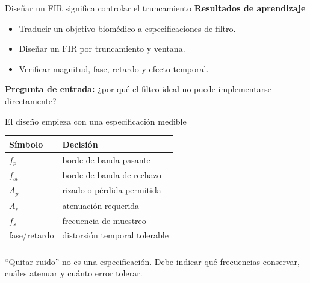 \documentclass[
  ignorenonframetext,
  aspectratio=169,
  spanish,
  professionalfonts]{beamer}
\newcounter{none} %
\providecommand{\tightlist}{%
  \setlength{\itemsep}{0pt}\setlength{\parskip}{0pt}}
\begin{document}
\begin{frame}{Diseñar un FIR significa controlar el truncamiento}
\protect{}\label{diseuxf1ar-un-fir-significa-controlar-el-truncamiento}
\textbf{Resultados de aprendizaje}

\begin{itemize}
\tightlist
\item
  Traducir un objetivo biomédico a especificaciones de filtro.
\item
  Diseñar un FIR por truncamiento y ventana.
\item
  Verificar magnitud, fase, retardo y efecto temporal.
\end{itemize}

\textbf{Pregunta de entrada:} ¿por qué el filtro ideal no puede
implementarse directamente?
\end{frame}

\begin{frame}{El diseño empieza con una especificación medible}
\protect{}\label{el-diseuxf1o-empieza-con-una-especificaciuxf3n-medible}
{\def\LTcaptype{none} %
\begin{longtable}[]{@{}ll@{}}
\toprule\noalign{}
Símbolo & Decisión \\
\midrule\noalign{}
\endhead
\(f_p\) & borde de banda pasante \\
\(f_{st}\) & borde de banda de rechazo \\
\(A_p\) & rizado o pérdida permitida \\
\(A_s\) & atenuación requerida \\
\(f_s\) & frecuencia de muestreo \\
fase/retardo & distorsión temporal tolerable \\
\bottomrule\noalign{}
\end{longtable}
}

\begin{tcolorbox}[enhanced jigsaw, arc=.35mm, bottomrule=.15mm, bottomtitle=1mm, breakable, colback=white, colbacktitle=quarto-callout-important-color!10!white, colframe=quarto-callout-important-color-frame, coltitle=black, left=2mm, leftrule=.75mm, opacityback=0, opacitybacktitle=0.6, rightrule=.15mm, title={Concepto principal}, titlerule=0mm, toprule=.15mm, toptitle=1mm]

``Quitar ruido'' no es una especificación. Debe indicar qué frecuencias
conservar, cuáles atenuar y cuánto error tolerar.

\end{tcolorbox}
\end{frame}
\end{document}
